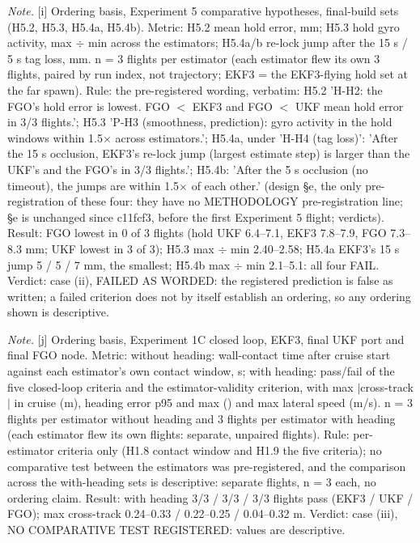 \begin{table}[htbp]
\textit{Note.} [i] Ordering basis, Experiment 5 comparative hypotheses, final-build sets (H5.2, H5.3, H5.4a, H5.4b). Metric: H5.2 mean hold error, mm; H5.3 hold gyro activity, max $\div$ min across the estimators; H5.4a/b re-lock jump after the 15 s / 5 s tag loss, mm. n = 3 flights per estimator (each estimator flew its own 3 flights, paired by run index, not trajectory; EKF3 = the EKF3-flying hold set at the far spawn). Rule: the pre-registered wording, verbatim: H5.2 'H-H2: the FGO's hold error is lowest. FGO $<$ EKF3 and FGO $<$ UKF mean hold error in 3/3 flights.'; H5.3 'P-H3 (smoothness, prediction): gyro activity in the hold windows within 1.5$\times$ across estimators.'; H5.4a, under 'H-H4 (tag loss)': 'After the 15 s occlusion, EKF3's re-lock jump (largest estimate step) is larger than the UKF's and the FGO's in 3/3 flights.'; H5.4b: 'After the 5 s occlusion (no timeout), the jumps are within 1.5$\times$ of each other.' (design \S{}e, the only pre-registration of these four: they have no METHODOLOGY pre-registration line; \S{}e is unchanged since c11fcf3, before the first Experiment 5 flight; verdicts). Result: FGO lowest in 0 of 3 flights (hold UKF 6.4--7.1, EKF3 7.8--7.9, FGO 7.3--8.3 mm; UKF lowest in 3 of 3); H5.3 max $\div$ min 2.40--2.58; H5.4a EKF3's 15 s jump 5 / 5 / 7 mm, the smallest; H5.4b max $\div$ min 2.1--5.1: all four FAIL. Verdict: case (ii), FAILED AS WORDED: the registered prediction is false as written; a failed criterion does not by itself establish an ordering, so any ordering shown is descriptive.\par
\textit{Note.} [j] Ordering basis, Experiment 1C closed loop, EKF3, final UKF port and final FGO node. Metric: without heading: wall-contact time after cruise start against each estimator's own contact window, s; with heading: pass/fail of the five closed-loop criteria and the estimator-validity criterion, with max $|$cross-track$|$ in cruise (m), heading error p95 and max (\textdegree{}) and max lateral speed (m/s). n = 3 flights per estimator without heading and 3 flights per estimator with heading (each estimator flew its own flights: separate, unpaired flights). Rule: per-estimator criteria only (H1.8 contact window and H1.9 the five criteria); no comparative test between the estimators was pre-registered, and the comparison across the with-heading sets is descriptive: separate flights, n = 3 each, no ordering claim. Result: with heading 3/3 / 3/3 / 3/3 flights pass (EKF3 / UKF / FGO); max cross-track 0.24--0.33 / 0.22--0.25 / 0.04--0.32 m. Verdict: case (iii), NO COMPARATIVE TEST REGISTERED: values are descriptive.\par

\end{table}
